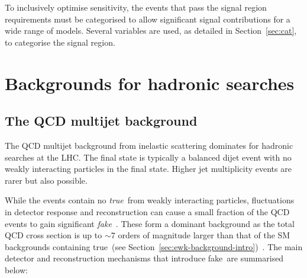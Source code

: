 To inclusively optimise sensitivity, the events that pass the signal region requirements 
must be categorised to allow significant signal contributions for a wide range of models. 
Several variables are used, as detailed in Section~\ref{sec:cat}, to categorise the signal region. 

\section{Backgrounds for hadronic searches}
\subsection{The QCD multijet background}
\label{sec:qcd-background-intro}
The QCD multijet background from inelastic scattering dominates for hadronic searches at the LHC. 
The final state is typically a balanced dijet event with no weakly interacting particles 
in the final state. Higher jet multiplicity events are rarer but also possible.

While the events contain no \emph{true}~\met from weakly interacting particles,
fluctuations in detector response and reconstruction can cause a small fraction 
of the QCD events to gain significant \emph{fake}~\met. These form a dominant background as 
the total QCD cross section is up to $\sim7$ orders of magnitude larger 
than that of the SM backgrounds containing true~\met (see Section~\ref{sec:ewk-background-intro})~\cite{inelast}.
The main detector and reconstruction mechanisms that introduce fake~\met are summarised below:

